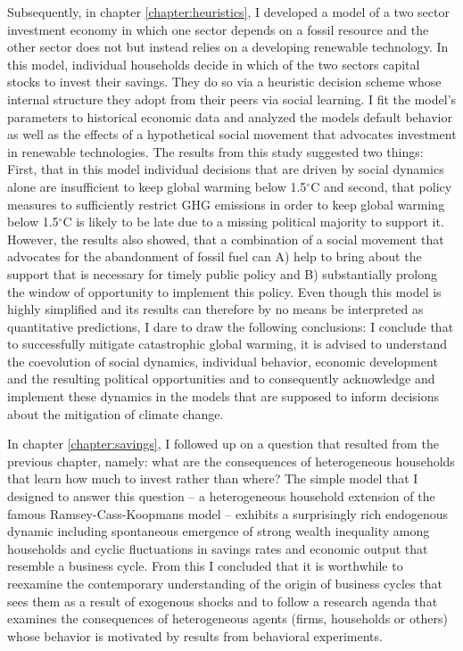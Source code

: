 Subsequently, in chapter \ref{chapter:heuristics}, I developed a model of a two sector investment economy in which one sector depends on a fossil resource and the other sector does not but instead relies on a developing renewable technology. In this model, individual households decide in which of the two sectors capital stocks to invest their savings. They do so via a heuristic decision scheme whose internal structure they adopt from their peers via social learning. I fit the model's parameters to historical economic data and analyzed the models default behavior as well as the effects of a hypothetical social movement that advocates investment in renewable technologies.
The results from this study suggested two things: First, that in this model individual decisions that are driven by social dynamics alone are insufficient to keep global warming below 1.5$^\circ$C and second, that policy measures to sufficiently restrict GHG emissions in order to keep global warming below 1.5$^\circ$C is likely to be late due to a missing political majority to support it. However, the results also showed, that a combination of a social movement that advocates for the abandonment of fossil fuel can A) help to bring about the support that is necessary for timely public policy and B) substantially prolong the window of opportunity to implement this policy. Even though this model is highly simplified and its results can therefore by no means be interpreted as quantitative predictions, I dare to draw the following conclusions:
I conclude that to successfully mitigate catastrophic global warming, it is advised to understand the coevolution of social dynamics, individual behavior, economic development and the resulting political opportunities and to consequently acknowledge and implement these dynamics in the models that are supposed to inform decisions about the mitigation of climate change.

In chapter \ref{chapter:savings}, I followed up on a question that resulted from the previous chapter, namely: what are the consequences of heterogeneous households that learn how much to invest rather than where? The simple model that I designed to answer this question -- a heterogeneous household extension of the famous Ramsey-Cass-Koopmans model -- exhibits a surprisingly rich endogenous dynamic including spontaneous emergence of strong wealth inequality among households and cyclic fluctuations in savings rates and economic output that resemble a business cycle.
From this I concluded that it is worthwhile to reexamine the contemporary understanding of the origin of business cycles that sees them as a result of exogenous shocks and to follow a research agenda that examines the consequences of heterogeneous agents (firms, households or others) whose behavior is motivated by results from behavioral experiments.

